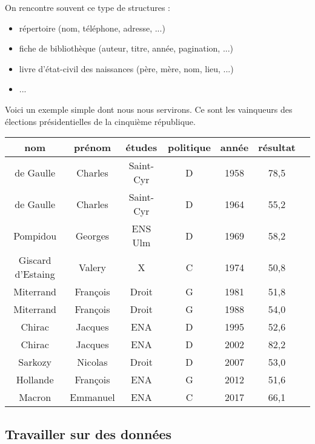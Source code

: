 On rencontre souvent ce type de structures :
\begin{itemize}
\item répertoire (nom, téléphone, adresse, ...)
\item fiche de bibliothèque (auteur, titre, année, pagination, ...)
\item livre d'état-civil des naissances (père, mère, nom, lieu, ...)
\item ...
\end{itemize}

Voici un exemple simple dont nous nous servirons. Ce sont les vainqueurs des élections présidentielles de la cinquième république.
\begin{center}
\begin{tabular}{|c|c|c|c|c|c|c|}
\hline
{\bf nom} &{\bf prénom} & {\bf études}& {\bf politique}& {\bf année}&{\bf résultat}\\
  \hline
de Gaulle & Charles & Saint-Cyr&D& 1958&78,5\\
de Gaulle & Charles & Saint-Cyr&D&1964&55,2\\
Pompidou & Georges & ENS Ulm&D& 1969&58,2\\
Giscard d'Estaing &Valery&X&C&1974&50,8\\
Miterrand &François&Droit&G&1981&51,8\\
Miterrand &François&Droit&G&1988&54,0\\
Chirac &Jacques&ENA&D&1995&52,6\\
Chirac &Jacques&ENA&D&2002&82,2\\
Sarkozy &Nicolas&Droit&D&2007&53,0\\
Hollande &François&ENA&G&2012&51,6\\
Macron &Emmanuel&ENA&C&2017&66,1\\
\hline
\end{tabular}
\end{center}
\subsection{Travailler sur des données}
